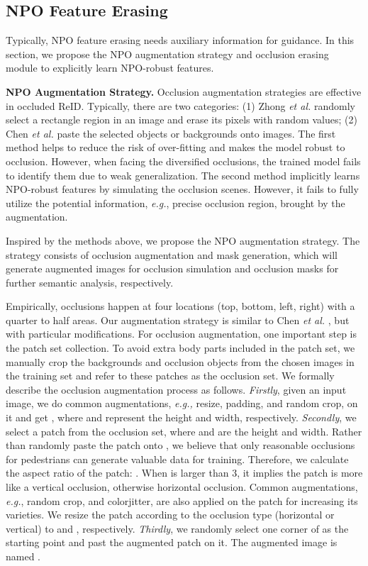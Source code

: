 \documentclass[10pt,twocolumn,letterpaper]{article}
\begin{document}
\subsection{NPO Feature Erasing}
Typically, NPO feature erasing needs auxiliary information for guidance. In this section, we propose the NPO augmentation strategy and occlusion erasing module to explicitly learn NPO-robust features. 

\textbf{NPO Augmentation Strategy.}
Occlusion augmentation strategies are effective in occluded ReID. Typically, there are two categories: (1) Zhong \emph{et al.} \cite{zhong2020random} randomly select a rectangle region in an image and erase its pixels with random values; (2) Chen \emph{et al.} \cite{chen2021occlude} paste the selected objects or backgrounds onto images. The first method helps to reduce the risk of over-fitting and makes the model robust to occlusion. However, when facing the diversified occlusions, the trained model fails to identify them due to weak generalization. The second method implicitly learns NPO-robust features by simulating the occlusion scenes. However, it fails to fully utilize the potential information, \emph{e.g.}, precise occlusion region, brought by the augmentation.


Inspired by the methods above, we propose the NPO augmentation strategy. The strategy consists of occlusion augmentation and mask generation, which will generate augmented images for occlusion simulation and occlusion masks for further semantic analysis, respectively. 


Empirically, occlusions happen at four locations (top, bottom, left, right) with a quarter to half areas. Our augmentation strategy is similar to Chen \emph{et al.} \cite{chen2021occlude}, but with particular modifications. For occlusion augmentation, one important step is the patch set collection. To avoid extra body parts included in the patch set, we manually crop the backgrounds and occlusion objects from the chosen images in the training set and refer to these patches as the occlusion set. 
We formally describe the occlusion augmentation process as follows. \emph{Firstly}, given an input image, we do common augmentations, \emph{e.g.,} resize, padding, and random crop, on it and get , where  and  represent the height and width, respectively.
\emph{Secondly}, we select a patch  from the occlusion set, where  and  are the height and width. Rather than randomly paste the patch onto , we believe that only reasonable occlusions for pedestrians can generate valuable data for training. 
Therefore, we calculate the aspect ratio of the patch: . When  is larger than 3, it implies the patch is more like a vertical occlusion, otherwise horizontal occlusion. 
Common augmentations, \emph{e.g.}, random crop, and colorjitter, are also applied on the patch for increasing its varieties. We resize the patch according to the occlusion type (horizontal or vertical) to  and , respectively. \emph{Thirdly}, we randomly select one corner of  as the starting point and past the augmented patch on it. The augmented image is named .
\end{document}
